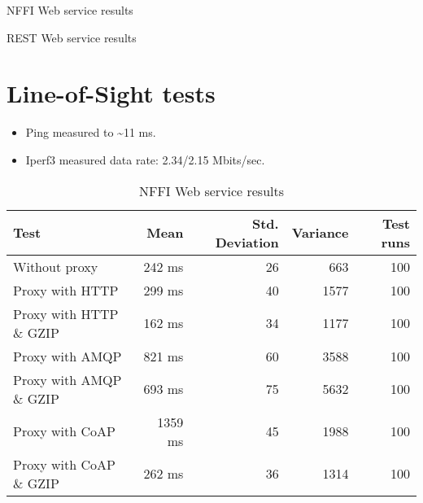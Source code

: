 \begin{appendices}
\begin{table}[H]

\caption{NFFI Web service results}
\end{table}


\begin{table}[H]

\caption{REST Web service results}
\end{table}


\section{Line-of-Sight tests}

\begin{itemize}
	\item Ping measured to \textasciitilde 11 ms.
	\item Iperf3 measured data rate: 2.34/2.15 Mbits/sec.
\end{itemize}

\begin{table}[H]
\begin{tabular}{| l | r | r | r | r |}
\hline
  \textbf{Test} & \textbf{Mean} & \textbf{Std. Deviation} & \textbf{Variance} & \textbf{Test runs}\\ \hline
  Without proxy & 242 ms & 26 & 663 & 100 \\ \hline
  Proxy with HTTP & 299 ms & 40 & 1577 & 100 \\ \hline
  Proxy with HTTP \& GZIP & 162 ms & 34 & 1177 & 100 \\ \hline
  Proxy with AMQP & 821 ms & 60 & 3588 & 100 \\ \hline
  Proxy with AMQP \& GZIP & 693 ms & 75 & 5632 & 100\\ \hline
  Proxy with CoAP & 1359 ms & 45 & 1988 & 100 \\ \hline
  Proxy with CoAP \& GZIP & 262 ms & 36 & 1314 & 100 \\ \hline
\end{tabular}
\caption{NFFI Web service results}
\end{table}



\end{appendices}
